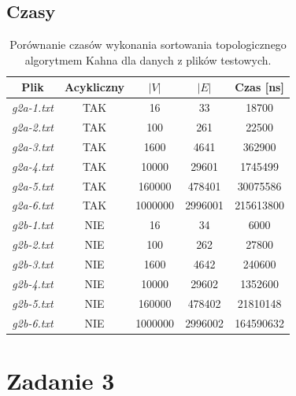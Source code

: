 \documentclass{article}
\begin{document}
\subsection{Czasy}
\begin{table}[H]
\begin{adjustbox}{center}
\begin{tabular}{|c|c|c|c|c|}
    \hline
    Plik & Acykliczny & $|V|$ & $|E|$ & Czas [ns]\\
    \hline
    \textit{g2a-1.txt} & TAK & 16 & 33 & 18700\\
    \hline
    \textit{g2a-2.txt} & TAK & 100 & 261 & 22500\\
    \hline
    \textit{g2a-3.txt} & TAK & 1600 & 4641 & 362900\\
    \hline
    \textit{g2a-4.txt} & TAK & 10000 & 29601 & 1745499\\
    \hline
    \textit{g2a-5.txt} & TAK & 160000 & 478401 & 30075586\\
    \hline
    \textit{g2a-6.txt} & TAK & 1000000 & 2996001 & 215613800\\
    \hline
    \textit{g2b-1.txt} & NIE & 16 & 34 & 6000\\
    \hline
    \textit{g2b-2.txt} & NIE & 100 & 262 & 27800\\
    \hline
    \textit{g2b-3.txt} & NIE & 1600 & 4642 & 240600\\
    \hline
    \textit{g2b-4.txt} & NIE & 10000 & 29602 & 1352600\\
    \hline
    \textit{g2b-5.txt} & NIE & 160000 & 478402 & 21810148\\
    \hline
    \textit{g2b-6.txt} & NIE & 1000000 & 2996002 & 164590632\\
    \hline
\end{tabular}
\end{adjustbox}
\caption{Porównanie czasów wykonania sortowania topologicznego algorytmem Kahna dla danych z plików testowych.}
\end{table}

\section{Zadanie 3}
\end{document}
